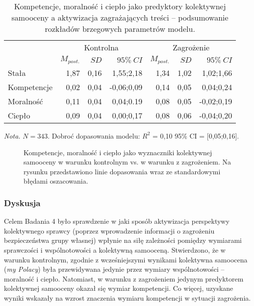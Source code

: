 \documentclass[man]{apa6}
\begin{document}
\begin{table*}[htbp]
\vspace*{2em}
\centering
\begin{threeparttable}
\caption{Kompetencje, moralność i ciepło jako predyktory kolektywnej samooceny a aktywizacja zagrażających treści -- podsumowanie rozkładów brzegowych parametrów modelu.}
\label{tab:4}
\begin{tabular}{lrrrrrr}

\midrule
 &
\multicolumn{3}{c}{Kontrolna} &
\multicolumn{3}{c}{Zagrożenie} \\
\cline{2-7}
 & $M_{post.}$    & $SD$   & $95\%\ CI$   & $M_{post.}$    & $SD$   & $95\%\ CI$  \\
\midrule
 Stała       &  1,87 & 0,16 &  1,55;2,18 &  1,34 & 1,02 &  1,02;1,66 \\
 Kompetencje &  0,02 & 0,04 & -0,06;0,09 &  0,14 & 0,05 &  0,04;0,24 \\
 Moralność   &  0,11 & 0,04 &  0,04;0.19 &  0,08 & 0,05 & -0,02;0,19 \\
 Ciepło      &  0,09 & 0,04 &  0,00;0,17 &  0,08 & 0,06 & -0,04;0,20 \\
\bottomrule
\end{tabular}
\begin{tablenotes}
{\small
\textit{Nota.} $N = 343$. Dobroć dopasowania modelu: $R^2$ = 0,10 95\% CI = [0,05;0,16].
}
\end{tablenotes}
\end{threeparttable}
\end{table*}

\begin{figure*}[htbp]
   \centering
   \caption{Kompetencje, moralność i ciepło jako wyznaczniki kolektywnej samooceny w warunku kontrolnym vs. w warunku z zagrożeniem. Na rysunku przedstawiono linie dopasowania wraz ze standardowymi błędami oszacowania.}
   \label{fig:study4}
\end{figure*}

\subsubsection{Dyskusja}
Celem Badania 4 było sprawdzenie w jaki sposób aktywizacja perspektywy kolektywnego sprawcy (poprzez wprowadzenie informacji o zagrożeniu bezpieczeństwa grupy własnej) wpłynie na siłę zależności pomiędzy wymiarami sprawczości i wspólnotowości a kolektywną samooceną. Stwierdzono, że w warunku kontrolnym, zgodnie z wcześniejszymi wynikami kolektywna samoocena (\emph{my Polacy}) była przewidywana jedynie przez wymiary wspólnotowości -- moralność i ciepło. Natomiast, w warunku z zagrożeniem jedynym predyktorem kolektywnej samooceny okazał się wymiar kompetencji. Co więcej, uzyskane wyniki wskazały na wzrost znaczenia wymiaru kompetencji w sytuacji zagrożenia.\\
\end{document}
